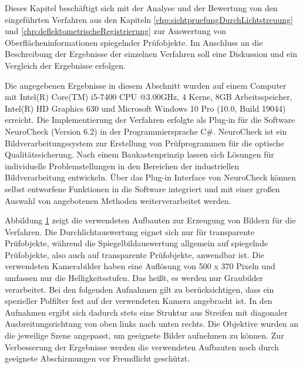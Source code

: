 Dieses Kapitel beschäftigt sich mit der Analyse und der Bewertung von den eingeführten Verfahren aus den Kapiteln \ref{chp:sichtpruefungDurchLichtstreuung} und \ref{chp:deflektometrischeRegistrierung} zur Auswertung von Oberflächeninformationen spiegelnder Prüfobjekte.
Im Anschluss an die Beschreibung der Ergebnisse der einzelnen Verfahren soll eine Diskussion und ein Vergleich der Ergebnisse erfolgen.

\p
Die angegebenen Ergebnisse in diesem Abschnitt wurden auf einem Computer mit Intel(R) Core(TM) i5-7400 CPU @3.00GHz, 4 Kerne, 8GB Arbeitsspeicher, Intel(R) HD Graphics 630 und Microsoft Windows 10 Pro (10.0, Build 19044) erreicht.
Die Implementierung der Verfahren erfolgte als Plug-in für die Software NeuroCheck (Version 6.2) in der Programmiersprache C\#.
NeuroCheck ist ein Bildverarbeitungssystem zur Erstellung von Prüfprogrammen für die optische Qualitätssicherung.
Nach einem Baukastenprinzip lassen sich Lösungen für individuelle Problemstellungen in den Bereichen der industriellen Bildverarbeitung entwickeln.
Über das Plug-in Interface von NeuroCheck können selbst entworfene Funktionen in die Software integriert und mit einer großen Auswahl von angebotenen Methoden weiterverarbeitet werden.

{
	\begin{figure}[H]
		\centering
		
		\label{tikz:abbAufbauFotos}
	\end{figure}
}

\noindent
Abbildung \ref{tikz:abbAufbauFotos} zeigt die verwendeten Aufbauten zur Erzeugung von Bildern für die Verfahren.
Die Durchlichtauswertung eignet sich nur für transparente Prüfobjekte, während die Spiegelbildauswertung allgemein auf spiegelnde Prüfobjekte, also auch auf transparente Prüfobjekte, anwendbar ist.
Die verwendeten Kamerabilder haben eine Auflösung von 500 x 370 Pixeln und umfassen nur die Helligkeitsstufen. 
Das heißt, es werden nur Graubilder verarbeitet.
Bei den folgenden Aufnahmen gilt zu berücksichtigen, dass ein spezieller Polfilter fest auf der verwendeten Kamera angebracht ist.
In den Aufnahmen ergibt sich dadurch stets eine Struktur aus Streifen mit diagonaler Ausbreitungsrichtung von oben links nach unten rechts.
Die Objektive wurden an die jeweilige Szene angepasst, um geeignete Bilder aufnehmen zu können.
Zur Verbesserung der Ergebnisse werden die verwendeten Aufbauten noch durch geeignete Abschirmungen vor Fremdlicht geschützt.

